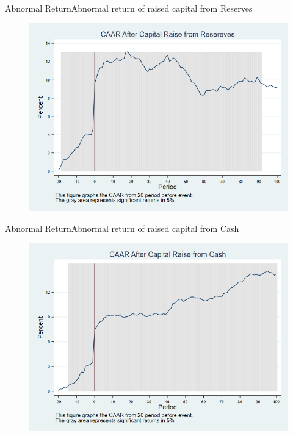 \documentclass{beamer}
\begin{document}
\begin{frame}{Abnormal Return}{Abnormal return of raised capital from Reserves}
\label{abreturnsavingWithoutAlpha}
\begin{figure}
\centering
\includegraphics[width=0.65\linewidth]{AbReturnSaving_WithoutAlpha}
\label{fig:abreturnsaving3}
\end{figure}

\hfill\hyperlink{abreturnsaving}{}
\end{frame}


\begin{frame}{Abnormal Return}{Abnormal return of raised capital from Cash}
\label{abreturncashWithoutAlpha}
\begin{figure}
\centering
\includegraphics[width=0.65\linewidth]{AbReturnCash_WithoutAlpha}
\label{fig:abreturncash3}
\end{figure}
\hfill\hyperlink{abreturncash}{}
\end{frame}
\end{document}
